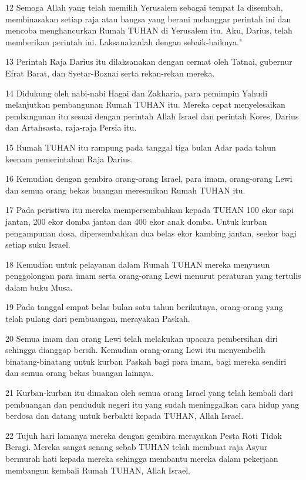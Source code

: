 \par 12 Semoga Allah yang telah memilih Yerusalem sebagai tempat Ia disembah, membinasakan setiap raja atau bangsa yang berani melanggar perintah ini dan mencoba menghancurkan Rumah TUHAN di Yerusalem itu. Aku, Darius, telah memberikan perintah ini. Laksanakanlah dengan sebaik-baiknya."
\par 13 Perintah Raja Darius itu dilaksanakan dengan cermat oleh Tatnai, gubernur Efrat Barat, dan Syetar-Boznai serta rekan-rekan mereka.
\par 14 Didukung oleh nabi-nabi Hagai dan Zakharia, para pemimpin Yahudi melanjutkan pembangunan Rumah TUHAN itu. Mereka cepat menyelesaikan pembangunan itu sesuai dengan perintah Allah Israel dan perintah Kores, Darius dan Artahsasta, raja-raja Persia itu.
\par 15 Rumah TUHAN itu rampung pada tanggal tiga bulan Adar pada tahun keenam pemerintahan Raja Darius.
\par 16 Kemudian dengan gembira orang-orang Israel, para imam, orang-orang Lewi dan semua orang bekas buangan meresmikan Rumah TUHAN itu.
\par 17 Pada peristiwa itu mereka mempersembahkan kepada TUHAN 100 ekor sapi jantan, 200 ekor domba jantan dan 400 ekor anak domba. Untuk kurban pengampunan dosa, dipersembahkan dua belas ekor kambing jantan, seekor bagi setiap suku Israel.
\par 18 Kemudian untuk pelayanan dalam Rumah TUHAN mereka menyusun penggolongan para imam serta orang-orang Lewi menurut peraturan yang tertulis dalam buku Musa.
\par 19 Pada tanggal empat belas bulan satu tahun berikutnya, orang-orang yang telah pulang dari pembuangan, merayakan Paskah.
\par 20 Semua imam dan orang Lewi telah melakukan upacara pembersihan diri sehingga dianggap bersih. Kemudian orang-orang Lewi itu menyembelih binatang-binatang untuk kurban Paskah bagi para imam, bagi mereka sendiri dan semua orang bekas buangan lainnya.
\par 21 Kurban-kurban itu dimakan oleh semua orang Israel yang telah kembali dari pembuangan dan penduduk negeri itu yang sudah meninggalkan cara hidup yang berdosa dan datang untuk berbakti kepada TUHAN, Allah Israel.
\par 22 Tujuh hari lamanya mereka dengan gembira merayakan Pesta Roti Tidak Beragi. Mereka sangat senang sebab TUHAN telah membuat raja Asyur bermurah hati kepada mereka sehingga membantu mereka dalam pekerjaan membangun kembali Rumah TUHAN, Allah Israel.

